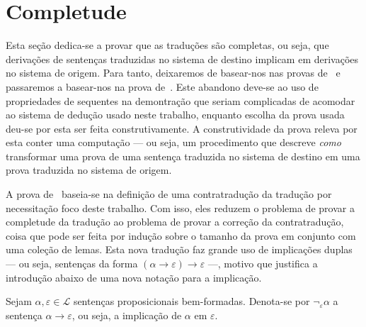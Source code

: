 \section{Completude}
    Esta seção dedica-se a provar que as traduções são completas, ou seja, que derivações de sentenças traduzidas no sistema de destino implicam em derivações no sistema de origem. Para tanto, deixaremos de basear-nos nas provas de~\cite{Troelstra} e passaremos a basear-nos na prova de~\cite{Flagg}. Este abandono deve-se ao uso de propriedades de sequentes na demontração que seriam complicadas de acomodar ao sistema de dedução usado neste trabalho, enquanto escolha da prova usada deu-se por esta ser feita construtivamente. A construtividade da prova releva por esta conter uma computação --- ou seja, um procedimento que descreve \emph{como} transformar uma prova de uma sentença traduzida no sistema de destino em uma prova traduzida no sistema de origem.

    A prova de~\cite{Flagg} baseia-se na definição de uma contratradução da tradução por necessitação foco deste trabalho. Com isso, eles reduzem o problema de provar a completude da tradução ao problema de provar a correção da contratradução, coisa que pode ser feita por indução sobre o tamanho da prova em conjunto com uma coleção de lemas. Esta nova tradução faz grande uso de implicações duplas --- ou seja, sentenças da forma $(\alpha\to\varepsilon)\to\varepsilon$ ---, motivo que justifica a introdução abaixo de uma nova notação para a implicação.

    \begin{notation}
        Sejam $\alpha,\varepsilon\in\mathcal{L}$ sentenças proposicionais bem-formadas. Denota-se por $\neg_\varepsilon\alpha$ a sentença $\alpha\to\varepsilon$, ou seja, a implicação de $\alpha$ em $\varepsilon$.
    \end{notation}

